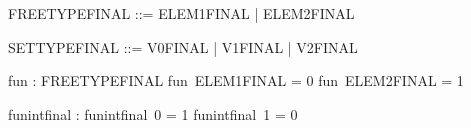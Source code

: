 %
\begin{zed}
   FREETYPEFINAL ::= ELEM1FINAL | ELEM2FINAL
\end{zed}

\begin{zed}
   SETTYPEFINAL ::= V0FINAL | V1FINAL | V2FINAL
\end{zed}




\begin{axdef}
      fun : FREETYPEFINAL \pfun \nat
    \where
      fun~ELEM1FINAL = 0 \land
      fun~ELEM2FINAL = 1
\end{axdef}

\begin{axdef}
      funintfinal : \nat \pfun \nat
    \where
      funintfinal~0 = 1 \land
      funintfinal~1 = 0
\end{axdef}


